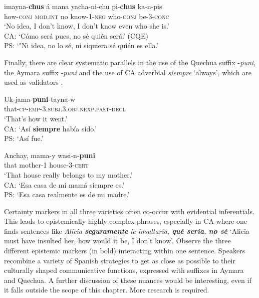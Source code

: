 \documentclass[output=paper,hidelinks]{langscibook}
\begin{document}
\ea \label{ex:chus}
\gll imayna-\textbf{chus} á mana yacha-ni-chu pi-\textbf{chus} ka-n-pis \\
how-\textsc{conj} \textsc{mod.int} no know-\textsc{1-neg} who-\textsc{conj} be-\textsc{3-conc} \\ 
\glt ‘No idea, I don't know, I don't know even who she is.'\\
CA: `Cómo será pues, no sé quién será.' (CQE)\\
PS: `"Ni idea, no lo sé, ni siquiera sé quién es ella.'
\z




Finally, there are clear systematic parallels in the use of the Quechua suffix -\textit{puni}, the Aymara suffix -\textit{puni} and the use of CA adverbial \textit{siempre} `always', which are used as validators \citep{cerron2008quechumara, RN64, coler2014grammar}. 

\ea \label{ex:ukjama}
\gll Uk-jama-\textbf{puni}-tayna-w \\
that-\textsc{cp-emp-3.subj.3.obj.nexp.past-decl} \\ \glt ‘That's how it went.’ \citep[148]{RN17}\\ 
CA: `Así \textbf{siempre} había sido.' \\
PS: `Así fue.'
\z

\ea \label{ex:mmamay}
\gll Anchay, mama-y wasi-n-\textbf{puni} \\
that mother-\textsc{1} house-\textsc{3-cert} \\ \glt ‘That house really belongs to my mother.’ \citep[170]{RN16}\\
CA: `Esa casa de mi mamá siempre es.' \\
PS: `Esa casa realmente es de mi madre.'
\z



Certainty markers in all three varieties often co-occur with evidential inferentials. This leads to epistemically highly complex phrases, especially in CA where one finds sentences like \textit{Alicia \textbf{seguramente} le insultaría, \textbf{qué sería}, \textbf{no sé}} ‘Alicia must have insulted her, how would it be, I don’t know’. Observe the three different epistemic markers (in bold) interacting within one sentence. Speakers recombine a variety of Spanish strategies to get as close as possible to their culturally shaped communicative functions, expressed with suffixes in Aymara and Quechua. A further discussion of these nuances would be interesting, even if it falls outside the scope of this chapter. More research is required.
\end{document}
